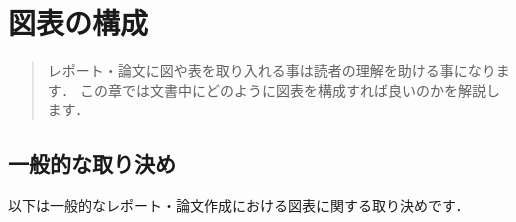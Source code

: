\chapter{図表の構成}
\begin{abstract}
%
レポート・論文に図や表を取り入れる事は読者の理解を助ける事になります．
この章では文書中にどのように図表を構成すれば良いのかを解説します．
\end{abstract}

\section{一般的な取り決め}

以下は一般的なレポート・論文作成における図表に関する取り決めです．

